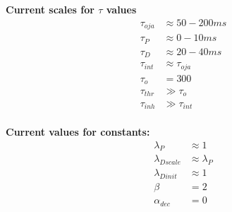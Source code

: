 \documentclass{article}
\begin{document}

{\bf Current scales for $\tau$ values}
\begin{align}
\displaystyle{\tau}_{oja} &\approx 50-200 ms\nonumber\\[2mm]
\displaystyle{\tau}_{P} &\approx 0-10 ms\nonumber\\[2mm]
\displaystyle{\tau}_{D} &\approx 20-40 ms\nonumber\\[2mm]
\displaystyle{\tau}_{int} &\approx \displaystyle{\tau}_{oja}\nonumber\\[2mm]
\displaystyle{\tau}_{o} &= 300\nonumber\\[2mm]
\displaystyle{\tau}_{thr} &\gg \displaystyle{\tau}_{o}\nonumber\\[2mm]
\displaystyle{\tau}_{inh} &\gg \displaystyle{\tau}_{int}\nonumber\\[2mm]
\end{align}

{\bf Current values for constants:}
\begin{align}
\lambda_{P} &\approx 1\nonumber\\[2mm]
\lambda_{Dscale} &\approx \lambda_{P}\nonumber\\[2mm]
\lambda_{Dinit} &\approx 1\nonumber\\[2mm]
\beta &= 2\nonumber\\[2mm]
\alpha_{dec} &= 0\nonumber
\end{align}
\end{document}
